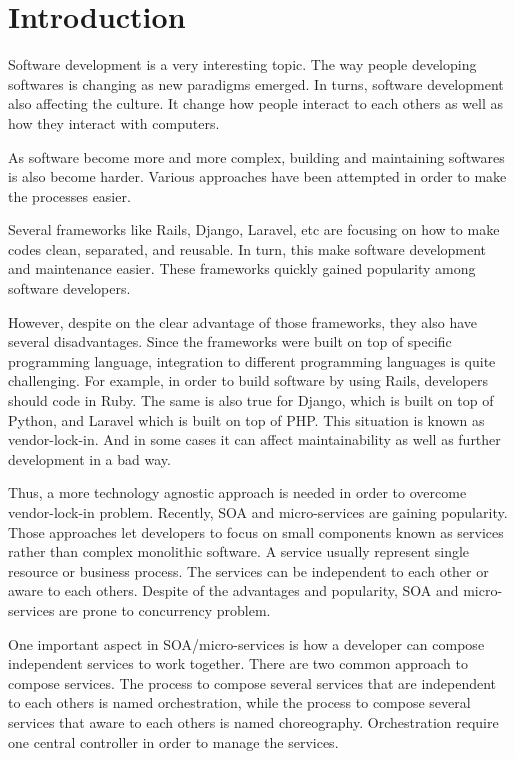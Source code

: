 \documentclass[conference]{IEEEtran}
\begin{document}
\IEEEpeerreviewmaketitle

\section{Introduction}

Software development is a very interesting topic. The way people developing softwares is changing as new paradigms emerged. In turns, software development also affecting the culture. It change how people interact to each others as well as how they interact with computers.

As software become more and more complex, building and maintaining softwares is also become harder. Various approaches have been attempted in order to make the processes easier.

Several frameworks like Rails, Django, Laravel, etc are focusing on how to make codes clean, separated, and reusable. In turn, this make software development and maintenance easier. These frameworks quickly gained popularity among software developers.

However, despite on the clear advantage of those frameworks, they also have several disadvantages. Since the frameworks were built on top of specific programming language, integration to different programming languages is quite challenging. For example, in order to build software by using Rails, developers should code in Ruby. The same is also true for Django, which is built on top of Python, and Laravel which is built on top of PHP. This situation is known as vendor-lock-in. And in some cases it can affect maintainability as well as further development in a bad way.

Thus, a more technology agnostic approach is needed in order to overcome vendor-lock-in problem. Recently, SOA and micro-services are gaining popularity. Those approaches let developers to focus on small components known as services rather than complex monolithic software. A service usually represent single resource or business process. The services can be independent to each other or aware to each others. Despite of the advantages and popularity, SOA and micro-services are prone to concurrency problem.

One important aspect in SOA/micro-services is how a developer can compose independent services to work together. There are two common approach to compose services. The process to compose several services that are independent to each others is named orchestration, while the process to compose several services that aware to each others is named choreography. Orchestration require one central controller in order to manage the services.
\end{document}
